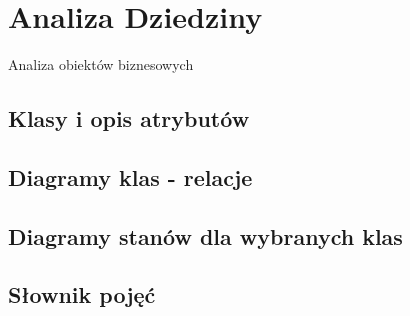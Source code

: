 \chapter{Analiza Dziedziny}
\label{cha:anDziedziny}

Analiza obiektów biznesowych


\section{Klasy i opis atrybutów}
\label{sec:klasyAtrybuty}




\section{Diagramy klas  - relacje}
\label{sec:diagKlas}




\section{Diagramy stanów dla wybranych klas}
\label{sec:diagStanow}




\section{Słownik pojęć}
\label{sec:slownik}

